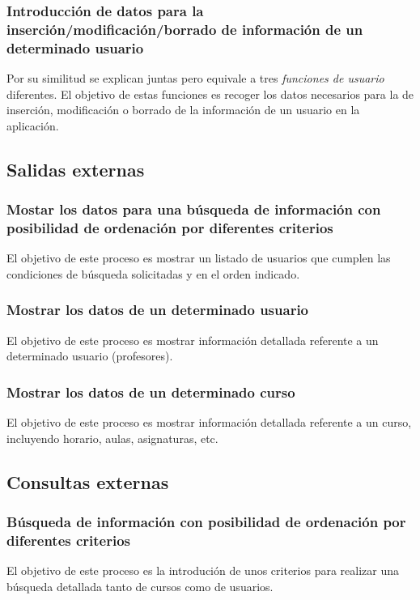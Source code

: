 \documentclass[11pt,a4paper,spanish,twoside]{book}
\begin{document}
\subsubsection{Introducción de datos para la inserción/modificación/borrado 
de información de un determinado usuario}
Por su similitud se explican juntas pero equivale a tres \emph{funciones de
usuario} diferentes. El objetivo de estas funciones es recoger los datos
necesarios para la de inserción, modificación o borrado de la información de
un usuario en la aplicación.

\subsection{Salidas externas}
\subsubsection{Mostar los datos para una búsqueda de información con
posibilidad de ordenación por diferentes criterios}
El objetivo de este proceso es mostrar un listado de usuarios que cumplen las
condiciones de búsqueda solicitadas y en el orden indicado.

\subsubsection{Mostrar los datos de un determinado usuario}
El objetivo de este proceso es mostrar información detallada referente a un
determinado usuario (profesores).

\subsubsection{Mostrar los datos de un determinado curso}
El objetivo de este proceso es mostrar información detallada referente a un
curso, incluyendo horario, aulas, asignaturas, etc.

\subsection{Consultas externas}
\subsubsection{Búsqueda de información con posibilidad de ordenación por
  diferentes criterios}
El objetivo de este proceso es la introdución de unos criterios para realizar 
una búsqueda detallada tanto de cursos como de usuarios.
\end{document}
